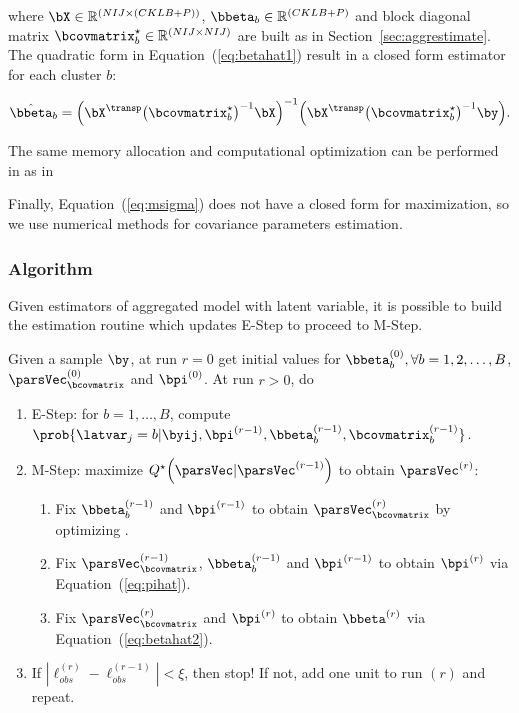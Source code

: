 \noindent where $\bX \in \mathbb{R}^{(NIJ \times (CKLB+P))}$, $\bbeta_b \in \mathbb{R}^{(CKLB+P)}$  and  block diagonal matrix $\bcovmatrix_b^\star \in \mathbb{R}^{(NIJ \times NIJ)}$ are built as in Section~\ref{sec:aggrestimate}. The quadratic form in Equation~(\ref{eq:betahat1}) result in a closed form estimator for each cluster $b$:

\begin{equation}
  \label{eq:betahat2}
  \hat{\bbeta}_b
  =
  \Bigl(
  \bX^\transp
  \bigl(\bcovmatrix_b^\star \bigr)^{-1}
  \bX
  \Bigr)^{-1}
  \Bigl(
  \bX^\transp
  \bigl(\bcovmatrix_b^\star \bigr)^{-1}
  \by
  \Bigr).
\end{equation}

The same memory allocation and computational optimization can be performed in  as in 

Finally, Equation~(\ref{eq:msigma}) does not have a closed form for maximization, so we use numerical methods for covariance parameters estimation.

\subsubsection{Algorithm}

Given estimators of aggregated model with latent variable, it is possible to build the estimation routine which updates E-Step to proceed to M-Step. 

\begin{algo}
  \label{algo:em}
    Given a sample $\by$, at run $r=0$ get initial values for $\bbeta_b^{(0)}, \forall b=1,2,\dots, B$, $\parsVec_{\bcovmatrix}^{(0)}$ and $\bpi^{(0)}$. At run $r>0$, do
    \begin{enumerate}
    \item E-Step: for $b=1,\dots,B$, compute
      $\prob{\latvar_j = b | \byij, \bpi^{(r-1)}, \bbeta_b^{(r-1)}, \bcovmatrix_b^{(r-1)}}$.
    \item M-Step: maximize $Q^\star \Bigl( \parsVec | \parsVec^{(r-1)}  \Bigr)$ to obtain $\parsVec^{(r)}$:
      \begin{enumerate}
      \item Fix $\bbeta_b^{(r-1)}$ and $\bpi^{(r-1)}$ to obtain $\parsVec_{\bcovmatrix}^{(r)}$ by optimizing .
      \item Fix $\parsVec_{\bcovmatrix}^{(r-1)}$, $\bbeta_b^{(r-1)}$ and $\bpi^{(r-1)}$ to obtain $\bpi^{(r)}$ via Equation~(\ref{eq:pihat}).
    \item Fix $\parsVec_{\bcovmatrix}^{(r)}$ and $\bpi^{(r)}$ to obtain $\bbeta^{(r)}$ via Equation~(\ref{eq:betahat2}).
    \end{enumerate}
  \item If $|\ell_{obs}^{(r)} - \ell_{obs}^{(r-1)}| < \xi$, then stop! If not, add one unit to run $(r)$ and repeat.
      \end{enumerate}
    \end{algo}

